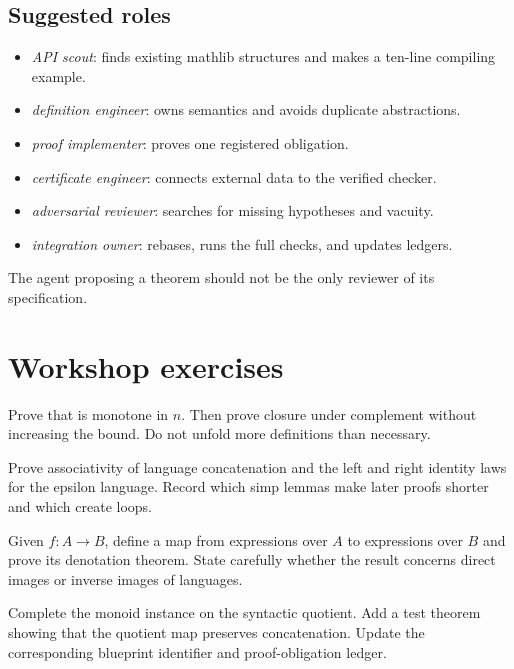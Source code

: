 \documentclass{amsart}
\begin{document}
\subsection{Suggested roles}

\begin{itemize}
  \item \emph{API scout}: finds existing mathlib structures and makes a ten-line compiling example.
  \item \emph{definition engineer}: owns semantics and avoids duplicate abstractions.
  \item \emph{proof implementer}: proves one registered obligation.
  \item \emph{certificate engineer}: connects external data to the verified checker.
  \item \emph{adversarial reviewer}: searches for missing hypotheses and vacuity.
  \item \emph{integration owner}: rebases, runs the full checks, and updates ledgers.
\end{itemize}
The agent proposing a theorem should not be the only reviewer of its specification.

\section{Workshop exercises}

\begin{exercise}
Prove that  is monotone in $n$.  Then prove closure under complement without increasing the bound.  Do not unfold more definitions than necessary.
\end{exercise}

\begin{exercise}
Prove associativity of language concatenation and the left and right identity laws for the epsilon language.  Record which simp lemmas make later proofs shorter and which create loops.
\end{exercise}

\begin{exercise}
Given $f:A\to B$, define a map from expressions over $A$ to expressions over $B$ and prove its denotation theorem.  State carefully whether the result concerns direct images or inverse images of languages.
\end{exercise}

\begin{exercise}
Complete the monoid instance on the syntactic quotient.  Add a test theorem showing that the quotient map preserves concatenation.  Update the corresponding blueprint identifier and proof-obligation ledger.
\end{exercise}
\end{document}
